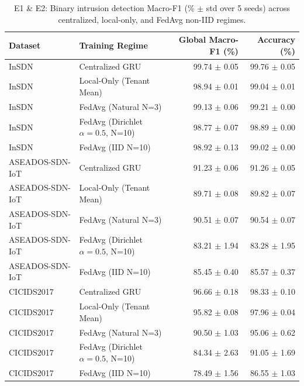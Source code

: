 \begin{table}[t]
\centering
\caption{E1 \& E2: Binary intrusion detection Macro-F1 (\% $\pm$ std over 5 seeds) across centralized, local-only, and FedAvg non-IID regimes.}
\label{tab:e1_e2_baselines}
\begin{tabular}{llrr}
\toprule
Dataset & Training Regime & Global Macro-F1 (\%) & Accuracy (\%) \\
\midrule
InSDN & Centralized GRU & 99.74 $\pm$ 0.05 & 99.76 $\pm$ 0.05 \\
InSDN & Local-Only (Tenant Mean) & 98.94 $\pm$ 0.01 & 99.04 $\pm$ 0.01 \\
InSDN & FedAvg (Natural N=3) & 99.13 $\pm$ 0.06 & 99.21 $\pm$ 0.00 \\
InSDN & FedAvg (Dirichlet $\alpha=0.5$, N=10) & 98.77 $\pm$ 0.07 & 98.89 $\pm$ 0.00 \\
InSDN & FedAvg (IID N=10) & 98.92 $\pm$ 0.13 & 99.02 $\pm$ 0.00 \\
\midrule
ASEADOS-SDN-IoT & Centralized GRU & 91.23 $\pm$ 0.06 & 91.26 $\pm$ 0.05 \\
ASEADOS-SDN-IoT & Local-Only (Tenant Mean) & 89.71 $\pm$ 0.08 & 89.82 $\pm$ 0.07 \\
ASEADOS-SDN-IoT & FedAvg (Natural N=3) & 90.51 $\pm$ 0.07 & 90.54 $\pm$ 0.07 \\
ASEADOS-SDN-IoT & FedAvg (Dirichlet $\alpha=0.5$, N=10) & 83.21 $\pm$ 1.94 & 83.28 $\pm$ 1.95 \\
ASEADOS-SDN-IoT & FedAvg (IID N=10) & 85.45 $\pm$ 0.40 & 85.57 $\pm$ 0.37 \\
\midrule
CICIDS2017 & Centralized GRU & 96.66 $\pm$ 0.18 & 98.33 $\pm$ 0.10 \\
CICIDS2017 & Local-Only (Tenant Mean) & 95.82 $\pm$ 0.08 & 97.96 $\pm$ 0.04 \\
CICIDS2017 & FedAvg (Natural N=3) & 90.50 $\pm$ 1.03 & 95.06 $\pm$ 0.62 \\
CICIDS2017 & FedAvg (Dirichlet $\alpha=0.5$, N=10) & 84.34 $\pm$ 2.63 & 91.05 $\pm$ 1.69 \\
CICIDS2017 & FedAvg (IID N=10) & 78.49 $\pm$ 1.56 & 86.55 $\pm$ 1.03 \\
\bottomrule
\end{tabular}
\end{table}
